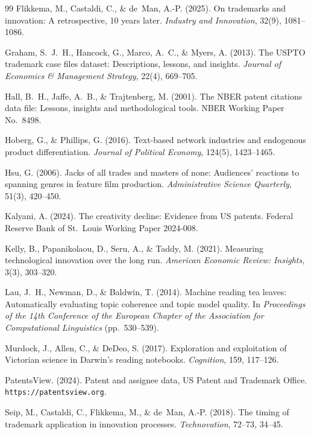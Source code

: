 \begin{thebibliography}{99}
Flikkema, M., Castaldi, C., \& de~Man, A.-P. (2025). On trademarks and
innovation: A retrospective, 10 years later. \emph{Industry and
Innovation}, 32(9), 1081--1086.

Graham, S.~J.~H., Hancock, G., Marco, A.~C., \& Myers, A. (2013). The USPTO
trademark case files dataset: Descriptions, lessons, and insights.
\emph{Journal of Economics \& Management Strategy}, 22(4), 669--705.

Hall, B.~H., Jaffe, A.~B., \& Trajtenberg, M. (2001). The NBER patent
citations data file: Lessons, insights and methodological tools. NBER
Working Paper No.\ 8498.

Hoberg, G., \& Phillips, G. (2016). Text-based network industries and
endogenous product differentiation. \emph{Journal of Political Economy},
124(5), 1423--1465.

Hsu, G. (2006). Jacks of all trades and masters of none: Audiences'
reactions to spanning genres in feature film production.
\emph{Administrative Science Quarterly}, 51(3), 420--450.

Kalyani, A. (2024). The creativity decline: Evidence from US patents.
Federal Reserve Bank of St.\ Louis Working Paper 2024-008.

Kelly, B., Papanikolaou, D., Seru, A., \& Taddy, M. (2021). Measuring
technological innovation over the long run. \emph{American Economic
Review: Insights}, 3(3), 303--320.

Lau, J.~H., Newman, D., \& Baldwin, T. (2014). Machine reading tea leaves:
Automatically evaluating topic coherence and topic model quality. In
\emph{Proceedings of the 14th Conference of the European Chapter of the
Association for Computational Linguistics} (pp.~530--539).

Murdock, J., Allen, C., \& DeDeo, S. (2017). Exploration and exploitation
of Victorian science in Darwin's reading notebooks. \emph{Cognition},
159, 117--126.

PatentsView. (2024). Patent and assignee data, US Patent and Trademark
Office. \texttt{https://patentsview.org}.

Seip, M., Castaldi, C., Flikkema, M., \& de~Man, A.-P. (2018). The timing
of trademark application in innovation processes. \emph{Technovation},
72--73, 34--45.


\end{thebibliography}
